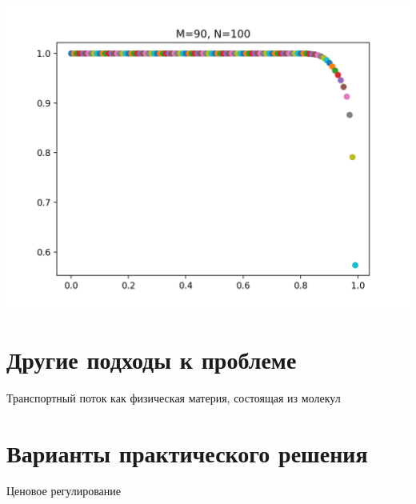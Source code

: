 \includegraphics[scale=0.5]{img/100_90}





\section{Другие подходы к проблеме}
Транспортный поток как физическая материя, состоящая из молекул \cite[168]{lukanin}
\section{Варианты практического решения}
Ценовое регулирование
